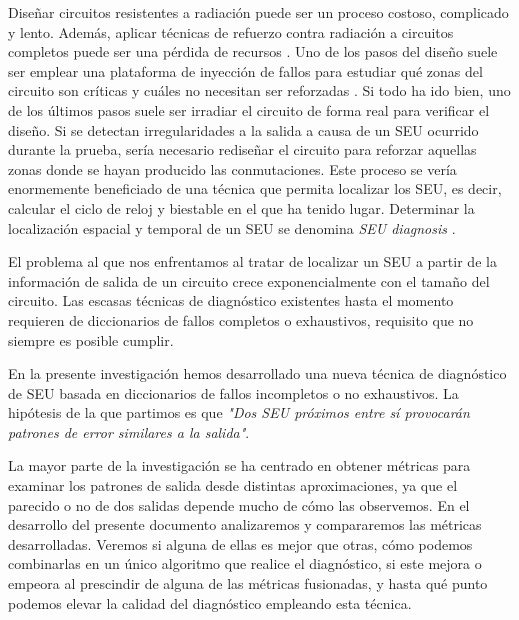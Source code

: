 Diseñar circuitos resistentes a radiación puede ser un proceso costoso, complicado
y lento. Además, aplicar técnicas de refuerzo contra radiación a circuitos 
completos puede ser una pérdida de recursos \cite{SelectiveHardening}. Uno de los
pasos del diseño suele ser emplear una plataforma de inyección de fallos para
estudiar qué zonas del circuito son críticas y cuáles no necesitan ser reforzadas 
\cite{SelectiveHardening}. Si todo ha ido bien, uno de los últimos pasos suele ser
irradiar el circuito de forma real para verificar el diseño. Si se detectan 
irregularidades a la salida a causa de un \gls{SEU} ocurrido durante la prueba,
sería necesario rediseñar el circuito para reforzar aquellas zonas donde se hayan producido las conmutaciones.
Este proceso se vería enormemente beneficiado de una técnica que permita localizar
los \gls{SEU}, es decir, calcular el ciclo de reloj y biestable en el que ha
tenido lugar. Determinar la localización espacial y temporal de un \gls{SEU} se
denomina \textit{\gls{SEU} diagnosis} \cite{SEUDiagnosis}.

El problema al que nos enfrentamos al tratar de localizar un \gls{SEU} a partir de
la información de salida de un circuito crece exponencialmente con el tamaño del
circuito. Las escasas técnicas de diagnóstico  existentes hasta el momento 
requieren de diccionarios de fallos completos o exhaustivos, requisito que no
siempre es posible cumplir.

En la presente investigación hemos desarrollado una nueva técnica de diagnóstico
de \gls{SEU} basada en diccionarios de fallos incompletos o no exhaustivos. La
hipótesis de la que partimos es que \textit{"Dos \gls{SEU} próximos entre sí
provocarán patrones de error similares a la salida"}. 

La mayor parte de la investigación se ha centrado en obtener métricas para 
examinar los patrones de salida desde distintas aproximaciones, ya que el parecido
o no de dos salidas depende mucho de cómo las observemos. En el desarrollo del
presente documento analizaremos y compararemos las métricas desarrolladas. Veremos
si alguna de ellas es mejor que otras, cómo podemos combinarlas en un único
algoritmo que realice el diagnóstico, si este mejora o empeora al prescindir
de alguna de las métricas fusionadas, y hasta qué punto podemos elevar la calidad
del diagnóstico empleando esta técnica.

\endinput
